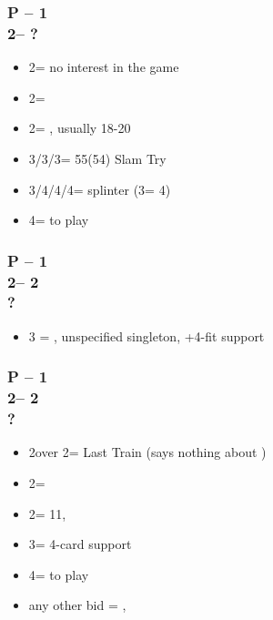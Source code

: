 \documentclass[12pt, a4paper]{article}
\begin{document}
\subsubsection*{P -- 1\spades \\ 2\clubs -- ?}
\begin{itemize}
    \item 2\spades = no interest in the game
    \item 2\diams = \inv
    \item 2\nt = \lsf, usually 18-20 \bal
    \item 3\clubs/3\diams/3\hearts = 55(54) Slam Try
    \item 3\nt/4\clubs/4\diams/4\hearts = splinter (3\nt = 4\hearts)
    \item 4\spades = to play
\end{itemize}

\subsubsection*{P -- 1\majs \\ 2\clubs -- 2\majs \\ ?}
\begin{itemize}
    \item 3 = \nat, unspecified singleton, +4-fit \majs support
\end{itemize}

\subsubsection*{P -- 1\majs \\ 2\clubs -- 2\diams \\ ?}
\begin{itemize}
    \item 2\hearts over 2\spades = Last Train (says nothing about \hearts)
    \item 2\majs = \soff
    \item 2\nt = 11, \bal
    \item 3\majs = 4-card support
    \item 4\majs = to play
    \item any other bid = \nat, \inv
\end{itemize}

\end{document}
